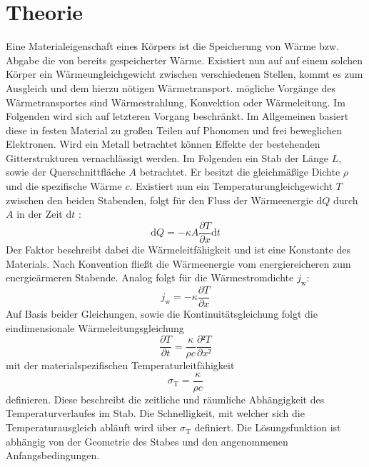 
\section{Theorie}
\label{sec:Theorie}
Eine Materialeigenschaft eines Körpers ist die Speicherung von Wärme bzw. Abgabe
die von bereits gespeicherter Wärme. Existiert nun auf auf einem solchen Körper
 ein Wärmeungleichgewicht zwischen verschiedenen Stellen, kommt es zum Ausgleich
 und dem hierzu nötigen Wärmetransport.
mögliche Vorgänge des Wärmetransportes sind Wärmestrahlung, Konvektion oder
  Wärmeleitung. Im Folgenden wird sich auf letzteren Vorgang beschränkt. Im
  Allgemeinen basiert diese in festen Material zu großen Teilen auf Phonomen und
   frei beweglichen Elektronen. Wird ein Metall betrachtet können Effekte der
    bestehenden Gitterstrukturen vernachlässigt werden. Im Folgenden ein Stab der
    Länge $L$, sowie der Querschnittfläche $A$ betrachtet. Er besitzt die
    gleichmäßige Dichte $\rho$ und die spezifische Wärme $c$. Existiert nun ein
    Temperaturungleichgewicht $T$ zwischen den beiden Stabenden, folgt für den Fluss
     der Wärmeenergie $\text{d}Q$ durch $A$ in der Zeit $\text{d}t$ :
     \begin{equation}
       \text{d}Q = -\kappa A \frac{\partial T}{\partial x} \text{d}t
       \end{equation}
       Der Faktor \kappa beschreibt dabei die Wärmeleitfähigkeit und ist eine
        Konstante des Materials. Nach Konvention fließt die Wärmeenergie vom
         energiereicheren zum energieärmeren Stabende. Analog folgt für die Wärmestromdichte $j_\text{w}$:
         \begin{equation}
           j_\text{w} = -\kappa \frac{\partial T}{\partial x}
           \end{equation}
           Auf Basis beider Gleichungen, sowie die Kontinuitätsgleichung folgt
            die eindimensionale Wärmeleitungsgleichung
            \begin{equation}
              \frac{\partial T}{\partial t} = \frac{\kappa}{\rho c}\frac{\partial² T}{\partial x²}
              \end{equation}
              mit der materialspezifischen Temperaturleitfähigkeit
              \begin{equation}
                \sigma_\text{T} = \frac{\kappa}{\rho c}
                \end{equation}
               definieren.
             Diese beschreibt
             die zeitliche und räumliche Abhängigkeit des Temperaturverlaufes im Stab.
             Die Schnelligkeit, mit welcher sich die Temperaturausgleich abläuft wird
             über $\sigma_\text{T}$ definiert. Die Lösungsfunktion ist abhängig
             von der Geometrie des Stabes und den angenommenen Anfangsbedingungen.

